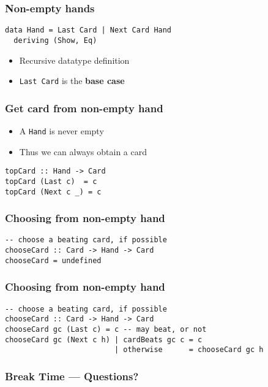 \documentclass{beamer}
\begin{document}
\begin{frame}[fragile]
  \frametitle{Non-empty hands}
\begin{verbatim}
data Hand = Last Card | Next Card Hand
  deriving (Show, Eq)
\end{verbatim}
  \begin{itemize}
  \item  Recursive datatype definition
  \item  \texttt{Last Card} is the \textbf{base case}
  \end{itemize}
\end{frame}
\begin{frame}[fragile]
  \frametitle{Get card from non-empty hand}
  \begin{itemize}
  \item  A \texttt{Hand} is never empty
  \item  Thus we can always obtain a card
  \end{itemize}
\begin{verbatim}
topCard :: Hand -> Card
topCard (Last c)  = c
topCard (Next c _) = c
\end{verbatim}
\end{frame}
\begin{frame}[fragile]
  \frametitle{Choosing from non-empty hand}
\begin{verbatim}
-- choose a beating card, if possible
chooseCard :: Card -> Hand -> Card
chooseCard = undefined
\end{verbatim}
\end{frame}
\begin{frame}[fragile]
  \frametitle{Choosing from non-empty hand}
\begin{verbatim}
-- choose a beating card, if possible
chooseCard :: Card -> Hand -> Card
chooseCard gc (Last c) = c -- may beat, or not
chooseCard gc (Next c h) | cardBeats gc c = c
                         | otherwise      = chooseCard gc h
\end{verbatim}
\end{frame}

\begin{frame}
  \frametitle{Break Time --- Questions?}
  \begin{center}
  \end{center}
\end{frame}
\end{document}
